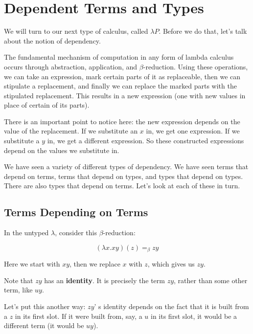 \documentclass{book}
\numberwithin{equation}{chapter}
\newcommand{\vocab}{\textbf}
\begin{document}
\chapter{Dependent Terms and Types}

We will turn to our next type of calculus, called $\lambda P$. Before we do that, let's talk about the notion of dependency.

The fundamental mechanism of computation in any form of lambda calculus occurs through abstraction, application, and $\beta$-reduction. Using these operations, we can take an expression, mark certain parts of it as replaceable, then we can stipulate a replacement, and finally we can replace the marked parts with the stipulated replacement. This results in a new expression (one with new values in place of certain of its parts).

There is an important point to notice here: the new expression depends on the value of the replacement. If we substitute an $x$ in, we get one expression. If we substitute a $y$ in, we get a different expression. So these constructed expressions depend on the values we substitute in.

We have seen a variety of different types of dependency. We have seen terms that depend on terms, terms that depend on types, and types that depend on types. There are also types that depend on terms. Let's look at each of these in turn.


\section{Terms Depending on Terms}

In the untyped $\lambda$, consider this $\beta$-reduction:

\begin{equation}
(\lambda x.xy)(z) =_{\beta} zy
\end{equation}

\noindent
Here we start with $xy$, then we replace $x$ with $z$, which gives us $zy$.

Note that $zy$ has an \vocab{identity}. It is precisely the term $zy$, rather than some other term, like $uy$.

Let's put this another way: $zy$' s identity depends on the fact that it is built from a $z$ in its first slot. If it were built from, say, a $u$ in its first slot, it would be a different term (it would be $uy$). 
\end{document}
